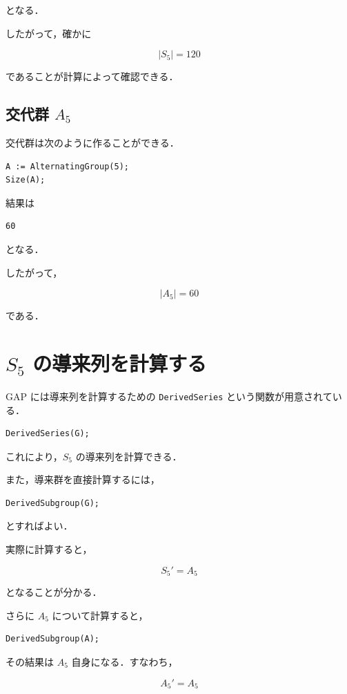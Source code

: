 \documentclass[a4paper,11pt]{jsarticle}
\begin{document}
となる．

したがって，確かに

$$
|S_5|=120
$$

であることが計算によって確認できる．

\subsection{交代群 $A_5$}

交代群は次のように作ることができる．

\begin{lstlisting}
A := AlternatingGroup(5);
Size(A);
\end{lstlisting}

結果は

\begin{lstlisting}
60
\end{lstlisting}

となる．

したがって，

$$
|A_5|=60
$$

である．

\section{$S_5$ の導来列を計算する}

GAP には導来列を計算するための
\texttt{DerivedSeries} という関数が用意されている．

\begin{lstlisting}
DerivedSeries(G);
\end{lstlisting}

これにより，$S_5$ の導来列を計算できる．

また，導来群を直接計算するには，

\begin{lstlisting}
DerivedSubgroup(G);
\end{lstlisting}

とすればよい．

実際に計算すると，

$$
S_5'=A_5
$$

となることが分かる．

さらに $A_5$ について計算すると，

\begin{lstlisting}
DerivedSubgroup(A);
\end{lstlisting}

その結果は $A_5$ 自身になる．すなわち，

$$
A_5'=A_5
$$
\end{document}
